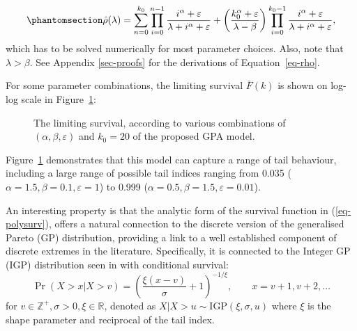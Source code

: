 \documentclass[
  sn-basic,
  10pt,
]{sn-jnl}
\theoremstyle{thmstyleone}
\theoremstyle{thmstyleone}
\theoremstyle{remark}
\theoremstyle{plain}
\theoremstyle{plain}
\theoremstyle{remark}
\begin{document}
\begin{equation}\phantomsection\label{eq-rho}{
\hat\rho(\lambda) = \sum_{n=0}^{k_0}\prod_{i=0}^{n-1}\frac{i^\alpha + \varepsilon}{\lambda+i^\alpha + \varepsilon} + \left(\frac{k_0^\alpha + \varepsilon}{\lambda-\beta}\right)\prod_{i=0}^{k_0-1}\frac{i^\alpha + \varepsilon}{\lambda + i^\alpha + \varepsilon}, 
}\end{equation} which has to be solved numerically for most parameter
choices. Also, note that \(\lambda>\beta\). See Appendix
\ref{sec-proofs} for the derivations of Equation~\ref{eq-rho}.

For some parameter combinations, the limiting survival \(\bar F(k)\) is
shown on log-log scale in Figure~\ref{fig-polylinsurv}:

\begin{figure}


\caption{\label{fig-polylinsurv}The limiting survival, according to
various combinations of \((\alpha, \beta, \varepsilon)\) and \(k_0=20\)
of the proposed GPA model.}

\end{figure}%

Figure~\ref{fig-polylinsurv} demonstrates that this model can capture a
range of tail behaviour, including a large range of possible tail
indices ranging from 0.035 (\(\alpha=1.5, \beta=0.1, \varepsilon=1\)) to
0.999 (\(\alpha=0.5, \beta=1.5, \varepsilon=0.01\)).

An interesting property is that the analytic form of the survival
function in (\ref{eq-polysurv}), offers a natural connection to the
discrete version of the generalised Pareto (GP) distribution, providing
a link to a well established component of discrete extremes in the
literature. Specifically, it is connected to the Integer GP (IGP)
distribution seen in \citet{Rohrbeck_2018} with conditional survival: \[
\Pr(X> x|X> v) = \left(\frac{\xi(x-v)}{\sigma} + 1\right)^{-1/\xi},\qquad  x=v+1,v+2,\ldots
\] for \(v\in\mathbb Z^+, \sigma>0,\xi\in \mathbb R\), denoted as
\(X|X>u \sim  \mathrm {IGP}(\xi, \sigma, u)\) where \(\xi\) is the shape
parameter and reciprocal of the tail index.
\end{document}
